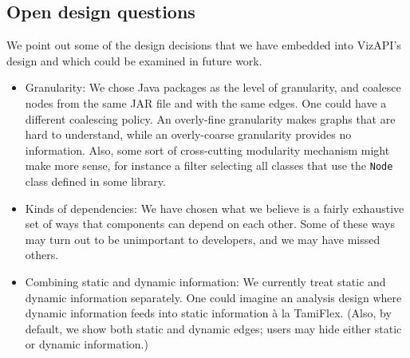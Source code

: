 \subsection{Open design questions}
We point out some of the design decisions that we have embedded into VizAPI's
design and which could be examined in future work.
\begin{itemize}
\item Granularity: We chose Java packages as the level of granularity, and coalesce nodes from the same JAR file and with the same edges. One could have a different coalescing policy. An overly-fine granularity makes graphs that are hard to understand, while an overly-coarse granularity provides no information. Also, some sort of cross-cutting modularity mechanism might make more sense, for instance a filter selecting all classes that use the \texttt{Node} class defined in some library.
\item Kinds of dependencies: We have chosen what we believe is a fairly exhaustive set of ways that components can depend on each other. Some of these ways may turn out to be unimportant to developers, and we may have missed others.
\item Combining static and dynamic information: We currently treat static and dynamic information separately. One could imagine an analysis design where dynamic information feeds into static information à la TamiFlex. (Also, by default, we show both static and dynamic edges; users may hide either static or dynamic information.)
\end{itemize}
